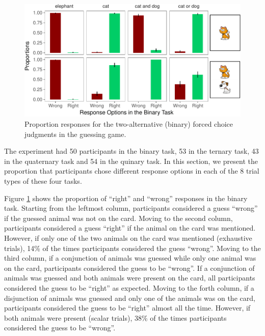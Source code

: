 \documentclass[floatsintext,man]{apa6}
\theoremstyle{definition}
\theoremstyle{definition}
\theoremstyle{definition}
\theoremstyle{remark}
\begin{document}
\begin{figure}
\centering
\includegraphics{writeup_files/figure-latex/binaryPlot-1.pdf}
\caption{\label{fig:binaryPlot}Proportion responses for the two-alternative
(binary) forced choice judgments in the guessing game.}
\end{figure}

The experiment had 50 participants in the binary task, 53 in the ternary
task, 43 in the quaternary task and 54 in the quinary task. In this
section, we present the proportion that participants chose different
response options in each of the 8 trial types of these four tasks.

Figure \ref{fig:binaryPlot} shows the proportion of \enquote{right} and
\enquote{wrong} responses in the binary task. Starting from the leftmost
column, participants considered a guess \enquote{wrong} if the guessed
animal was not on the card. Moving to the second column, participants
considered a guess \enquote{right} if the animal on the card was
mentioned. However, if only one of the two animals on the card was
mentioned (exhaustive trials), 14\% of the times participants considered
the guess \enquote{wrong}. Moving to the third column, if a conjunction
of animals was guessed while only one animal was on the card,
participants considered the guess to be \enquote{wrong}. If a
conjunction of animals was guessed and both animals were present on the
card, all participants considered the guess to be \enquote{right} as
expected. Moving to the forth column, if a disjunction of animals was
guessed and only one of the animals was on the card, participants
considered the guess to be \enquote{right} almost all the time. However,
if both animals were present (scalar trials), 38\% of the times
participants considered the guess to be \enquote{wrong}.
\end{document}
